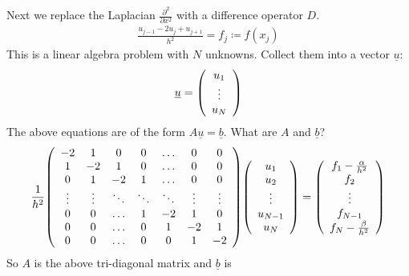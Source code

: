 \documentclass{article}
\begin{document}
        Next we replace the Laplacian $\frac{\partial^2}{\partial x^2}$ with a difference operator $D$.
        \begin{align}
            \frac{u_{j-1} - 2u_{j} + u_{j+1}}{h^2} = f_j \coloneqq f(x_j)
        \end{align}
        This is a linear algebra problem with $N$ unknowns.  Collect them into a vector $\underline{u}$:
        \begin{align}
            \underline{u} = \qty(\begin{array}{c}
                u_1 \\ \vdots \\ u_N
            \end{array})
        \end{align}
        The above equations are of the form $A\underline{u} = \underline{b}$.  What are $A$ and $\underline{b}$?
        \begin{align}
            \frac{1}{h^2}\qty(\begin{array}{ccccccc}
                -2 & 1 & 0 & 0 & \dots & 0 & 0 \\
                1 & -2 & 1 & 0 & \dots & 0 & 0 \\
                0 & 1 & -2 & 1 & \dots & 0 & 0 \\
                \vdots & \vdots & \ddots & \ddots & \ddots & \vdots & \vdots \\
                0 & 0 & \dots & 1 & -2 & 1 & 0 \\
                0 & 0 & \dots & 0 & 1 & -2 & 1 \\
                0 & 0 & \dots & 0 & 0 & 1 & -2
            \end{array})\qty(\begin{array}{c}
                u_1 \\ u_2 \\ \vdots \\ u_{N-1} \\ u_N
            \end{array}) = \qty(\begin{array}{c}
                f_1 - \frac{\alpha}{h^2} \\ f_2 \\ \vdots \\ f_{N-1} \\ f_N - \frac{\beta}{h^2}
            \end{array})
        \end{align}
        So $A$ is the above tri-diagonal matrix and $\underline{b}$ is
\end{document}
